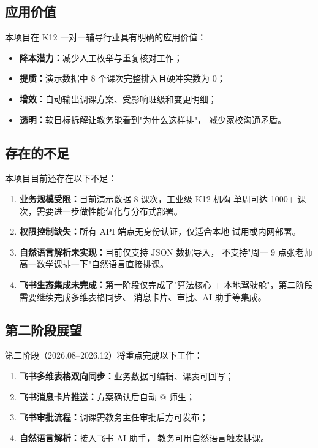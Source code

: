 \subsection{应用价值}

本项目在 K12 一对一辅导行业具有明确的应用价值：
\begin{itemize}[leftmargin=2em,itemsep=0.1em]
\item \textbf{降本潜力：}减少人工枚举与重复核对工作；
\item \textbf{提质：}演示数据中 8 个课次完整排入且硬冲突数为 0；
\item \textbf{增效：}自动输出调课方案、受影响班级和变更明细；
\item \textbf{透明：}软目标拆解让教务能看到"为什么这样排"，
  减少家校沟通矛盾。
\end{itemize}

\subsection{存在的不足}

本项目目前还存在以下不足：
\begin{enumerate}[leftmargin=2em,itemsep=0.2em]
\item \textbf{业务规模受限：}目前演示数据 8 课次，工业级 K12 机构
  单周可达 1000+ 课次，需要进一步做性能优化与分布式部署。
\item \textbf{权限控制缺失：}所有 API 端点无身份认证，仅适合本地
  试用或内网部署。
\item \textbf{自然语言解析未实现：}目前仅支持 JSON 数据导入，
  不支持"周一 9 点张老师高一数学课排一下"自然语言直接排课。
\item \textbf{飞书生态集成未完成：}第一阶段仅完成了"算法核心 +
  本地驾驶舱"，第二阶段需要继续完成多维表格同步、
  消息卡片、审批、AI 助手等集成。
\end{enumerate}

\subsection{第二阶段展望}

第二阶段（2026.08--2026.12）将重点完成以下工作：
\begin{enumerate}[leftmargin=2em,itemsep=0.2em]
\item \textbf{飞书多维表格双向同步：}业务数据可编辑、课表可回写；
\item \textbf{飞书消息卡片推送：}方案确认后自动 @ 师生；
\item \textbf{飞书审批流程：}调课需教务主任审批后方可发布；
\item \textbf{自然语言解析：}接入飞书 AI 助手，
  教务可用自然语言触发排课。
\end{enumerate}

